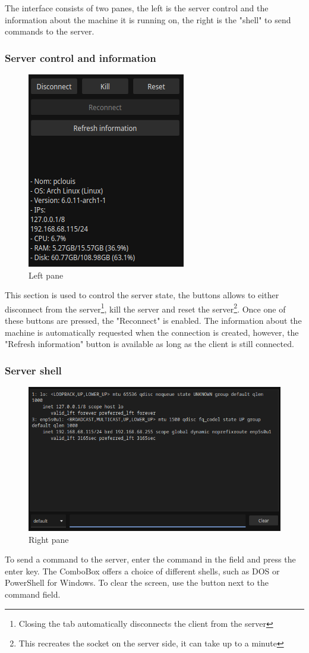 \documentclass{article}
\begin{document}
The interface consists of two panes, the left is the server control and the
information about the machine it is running on, the right is the "shell" to send
commands to the server.

\subsubsection{Server control and information}
\begin{figure}[H]
    \begin{center}
        \includegraphics[width=0.25\linewidth]{fig/left.png}
    \end{center}
    \caption{Left pane}
    \label{client:left}
\end{figure}
This section is used to control the server state, the buttons allows to either
disconnect from the server\footnote{Closing the tab automatically disconnects
the client from the server}, kill the server and reset the server\footnote{This
recreates the socket on the server side, it can take up to a minute}. Once one
of these buttons are pressed, the "Reconnect" is enabled. The information about
the machine is automatically requested when the connection is created, however,
the "Refresh information" button is available as long as the client is still
connected.

\subsubsection{Server shell}
\begin{figure}[H]
    \begin{center}
        \includegraphics[width=0.7\linewidth]{fig/command.png}
    \end{center}
    \caption{Right pane}
    \label{client:right}
\end{figure}
To send a command to the server, enter the command in the field and press the
enter key. The ComboBox offers a choice of different shells, such as DOS or
PowerShell for Windows. To clear the screen, use the button next to the command
field.
\end{document}
